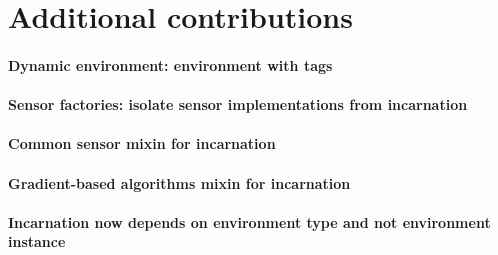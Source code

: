 \section{Additional contributions}
\paragraph{Dynamic environment: environment with tags}
\paragraph{Sensor factories: isolate sensor implementations from incarnation}
\paragraph{Common sensor mixin for incarnation}
\paragraph{Gradient-based algorithms mixin for incarnation}
\paragraph{Incarnation now depends on environment type and not environment instance}